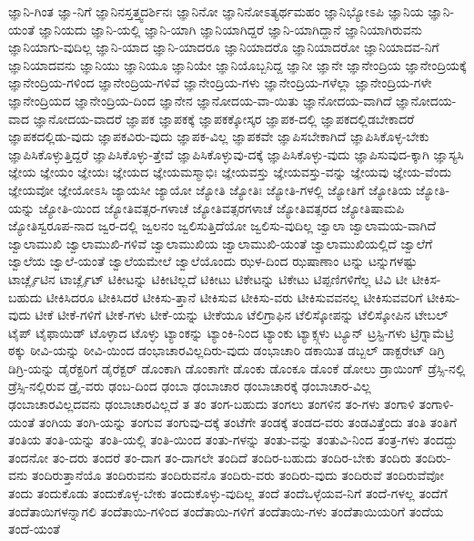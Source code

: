 {ಜ್ಞಾನಿ-ಗಿಂತ
ಜ್ಞಾ-ನಿಗೆ
ಜ್ಞಾನಿನಸ್ತತ್ತ್ವದರ್ಶಿನಃ
ಜ್ಞಾನಿನೋ
ಜ್ಞಾನಿನೋಽತ್ಯರ್ಥಮಹಂ
ಜ್ಞಾನಿಭ್ಯೋಽಪಿ
ಜ್ಞಾನಿಯ
ಜ್ಞಾನಿ-ಯಂತೆ
ಜ್ಞಾನಿಯದು
ಜ್ಞಾನಿ-ಯಲ್ಲಿ
ಜ್ಞಾನಿ-ಯಾಗಿ
ಜ್ಞಾನಿಯಾಗಿದ್ದರೆ
ಜ್ಞಾನಿ-ಯಾಗಿದ್ದಾನೆ
ಜ್ಞಾನಿಯಾಗಿರುವನು
ಜ್ಞಾನಿಯಾಗು-ವುದಿಲ್ಲ
ಜ್ಞಾನಿ-ಯಾದ
ಜ್ಞಾನಿ-ಯಾದರೂ
ಜ್ಞಾನಿಯಾದರೊ
ಜ್ಞಾನಿಯಾದರೋ
ಜ್ಞಾನಿಯಾದವ-ನಿಗೆ
ಜ್ಞಾನಿಯಾದವನು
ಜ್ಞಾನಿಯು
ಜ್ಞಾನಿಯೂ
ಜ್ಞಾನಿಯೇ
ಜ್ಞಾನಿಯೊಬ್ಬನಿದ್ದ
ಜ್ಞಾನೀ
ಜ್ಞಾನೇ
ಜ್ಞಾನೇಂದ್ರಿಯ
ಜ್ಞಾನೇಂದ್ರಿಯಕ್ಕೆ
ಜ್ಞಾನೇಂದ್ರಿಯ-ಗಳಿಂದ
ಜ್ಞಾನೇಂದ್ರಿಯ-ಗಳಿವೆ
ಜ್ಞಾನೇಂದ್ರಿಯ-ಗಳು
ಜ್ಞಾನೇಂದ್ರಿಯ-ಗಳೆಲ್ಲಾ
ಜ್ಞಾನೇಂದ್ರಿಯ-ಗಳೇ
ಜ್ಞಾನೇಂದ್ರಿಯದ
ಜ್ಞಾನೇಂದ್ರಿಯ-ದಿಂದ
ಜ್ಞಾನೇನ
ಜ್ಞಾನೋದಯ-ವಾ-ಯಿತು
ಜ್ಞಾನೋದಯ-ವಾಗಿದೆ
ಜ್ಞಾನೋದಯ-ವಾದ
ಜ್ಞಾನೋದಯ-ವಾದರೆ
ಜ್ಞಾಪಕ
ಜ್ಞಾಪಕಕ್ಕೆ
ಜ್ಞಾಪಕಕ್ಕೋಸ್ಕರ
ಜ್ಞಾಪಕ-ದಲ್ಲಿ
ಜ್ಞಾಪಕದಲ್ಲಿಡಬೇಕಾದರೆ
ಜ್ಞಾಪಕದಲ್ಲಿಡು-ವುದು
ಜ್ಞಾಪಕವಿರು-ವುದು
ಜ್ಞಾಪಕ-ವಿಲ್ಲ
ಜ್ಞಾಪಕವೇ
ಜ್ಞಾಪಿಸಬೇಕಾಗಿದೆ
ಜ್ಞಾಪಿಸಿಕೊಳ್ಳ-ಬೇಕು
ಜ್ಞಾಪಿಸಿಕೊಳ್ಳುತ್ತಿದ್ದರೆ
ಜ್ಞಾಪಿಸಿಕೊಳ್ಳು-ತ್ತೇವೆ
ಜ್ಞಾಪಿಸಿಕೊಳ್ಳುವು-ದಕ್ಕೆ
ಜ್ಞಾಪಿಸಿಕೊಳ್ಳು-ವುದು
ಜ್ಞಾಪಿಸುವುದ-ಕ್ಕಾಗಿ
ಜ್ಞಾಸ್ಯಸಿ
ಜ್ಞೇಯ
ಜ್ಞೇಯಂ
ಜ್ಞೇಯಃ
ಜ್ಞೇಯದ
ಜ್ಞೇಯಮಸ್ಮಾಭಿಃ
ಜ್ಞೇಯವಸ್ತು
ಜ್ಞೇಯವಸ್ತು-ವನ್ನು
ಜ್ಞೇಯವು
ಜ್ಞೇಯ-ವೆಂದು
ಜ್ಞೇಯವೋ
ಜ್ಞೇಯೋಽಸಿ
ಜ್ಯಾಯಸೀ
ಜ್ಯಾಯೋ
ಜ್ಯೋತಿ
ಜ್ಯೋತಿಃ
ಜ್ಯೋತಿ-ಗಳಲ್ಲಿ
ಜ್ಯೋತಿಗೆ
ಜ್ಯೋತಿಯ
ಜ್ಯೋತಿ-ಯನ್ನು
ಜ್ಯೋತಿ-ಯಿಂದ
ಜ್ಯೋತಿವತ್ಸರ-ಗಳಾಚೆ
ಜ್ಯೋತಿವತ್ಸರಗಳಾಚೆ
ಜ್ಯೋತಿವತ್ಸರದ
ಜ್ಯೋತಿಷಾಮಪಿ
ಜ್ಯೋತಿಸ್ವರೂಪ-ನಾದ
ಜ್ವರ-ದಲ್ಲಿ
ಜ್ವಲನಂ
ಜ್ವಲಿಸುತ್ತಿದೆಯೋ
ಜ್ವಲಿಸು-ವುದಿಲ್ಲ
ಜ್ವಾಲಾ
ಜ್ವಾಲಾಮಯ-ವಾಗಿದೆ
ಜ್ವಾಲಾಮುಖಿ
ಜ್ವಾಲಾಮುಖಿ-ಗಳಿವೆ
ಜ್ವಾಲಾಮುಖಿಯ
ಜ್ವಾಲಾಮುಖಿ-ಯಂತೆ
ಜ್ವಾಲಾಮುಖಿಯಲ್ಲಿದೆ
ಜ್ವಾಲೆಗೆ
ಜ್ವಾಲೆಯ
ಜ್ವಾಲೆ-ಯಂತೆ
ಜ್ವಾಲೆಯಮೇಲೆ
ಜ್ವಾಲೆಯೊಂದು
ಝಳ-ದಿಂದ
ಝಷಾಣಾಂ
ಟನ್ನು
ಟನ್ನುಗಳಷ್ಟು
ಟಾರ್ಚ್ಲೈಟಿನ
ಟಾರ್ಚ್ಲೈಟ್
ಟಿಕೀಟನ್ನು
ಟಿಕೀಟಿಲ್ಲದೆ
ಟಿಕೀಟು
ಟಿಕೇಟನ್ನು
ಟಿಕೇಟು
ಟಿಪ್ಪಣಿಗಳಿಗೆಲ್ಲ
ಟಿವಿ
ಟೀ
ಟೀಕಿಸ-ಬಹುದು
ಟೀಕಿಸಿದರೂ
ಟೀಕಿಸಿದರೆ
ಟೀಕಿಸು-ತ್ತಾನೆ
ಟೀಕಿಸುವ
ಟೀಕಿಸು-ವರು
ಟೀಕಿಸುವವನಲ್ಲ
ಟೀಕಿಸುವವರಿಗೆ
ಟೀಕಿಸು-ವುದು
ಟೀಕೆ
ಟೀಕೆ-ಗಳಿಗೆ
ಟೀಕೆ-ಗಳು
ಟೀಕೆ-ಯನ್ನು
ಟೀಕೆಯೂ
ಟೆಲಿಗ್ರಾಫಿನ
ಟೆಲಿಸ್ಕೋಪನ್ನು
ಟೆಲಿಸ್ಕೋಪಿನ
ಟೇಬಲ್
ಟೈಪ್
ಟೈಫಾಯಿಡ್
ಟೊಳ್ಳಾದ
ಟೊಳ್ಳು
ಟ್ಯಾಂಕನ್ನು
ಟ್ಯಾಂಕಿ-ನಿಂದ
ಟ್ಯಾಂಕು
ಟ್ಯಾಕ್ಸ್ಗಳು
ಟ್ಯೂನ್
ಟ್ರಸ್ಟಿ-ಗಳು
ಟ್ರಿಗ್ನಾಮೆಟ್ರಿ
ಠಕ್ಕು
ಠೀವಿ-ಯನ್ನು
ಠೀವಿ-ಯಿಂದ
ಡಂಭಾಚಾರವಿಲ್ಲದಿರು-ವುದು
ಡಂಭಾಚಾರಿ
ಡಕಾಯಿತ
ಡಬ್ಬಲ್
ಡಾಕ್ಟರೇಟ್
ಡಿಗ್ರಿ
ಡಿಗ್ರಿ-ಯನ್ನು
ಡೈರೆಕ್ಟರಿಗೆ
ಡೈರೆಕ್ಟರ್
ಡೊಂಕಾಗಿ
ಡೊಂಕಾಗೇ
ಡೊಂಕು
ಡೊಂಕೂ
ಡೊಂಕೆ
ಡೋಲು
ಡ್ರಾಯಿಂಗ್
ಡ್ರೆಸ್ಸಿ-ನಲ್ಲಿ
ಡ್ರೆಸ್ಸಿ-ನಲ್ಲಿರುವ
ಡ್ರೈ-ವರು
ಢಂಬ-ದಿಂದ
ಢಂಬಾ
ಢಂಬಾಚಾರ
ಢಂಬಾಚಾರಕ್ಕೆ
ಢಂಬಾಚಾರ-ವಿಲ್ಲ
ಢಂಬಾಚಾರವಿಲ್ಲದವನು
ಢಂಬಾಚಾರವಿಲ್ಲದೆ
ತ
ತಂ
ತಂಗ-ಬಹುದು
ತಂಗಲು
ತಂಗಳಿನ
ತಂ-ಗಳು
ತಂಗಾಳಿ
ತಂಗಾಳಿ-ಯಂತೆ
ತಂಗಿಯ
ತಂಗಿ-ಯನ್ನು
ತಂಗುವ
ತಂಗುವು-ದಕ್ಕೆ
ತಂಟೆಗೇ
ತಂಡಕ್ಕೆ
ತಂಡದ-ವರು
ತಂಡವಿತ್ತೆಂದು
ತಂತಿ
ತಂತಿಗೆ
ತಂತಿಯ
ತಂತಿ-ಯನ್ನು
ತಂತಿ-ಯಲ್ಲಿ
ತಂತಿ-ಯಿಂದ
ತಂತು-ಗಳನ್ನು
ತಂತು-ವನ್ನು
ತಂತುವಿ-ನಿಂದ
ತಂತ್ರ-ಗಳು
ತಂದದ್ದು
ತಂದನೋ
ತಂ-ದರು
ತಂದರೆ
ತಂ-ದಾಗ
ತಂ-ದಾಗಲೇ
ತಂದಿದೆ
ತಂದಿರ-ಬಹುದು
ತಂದಿರ-ಬೇಕು
ತಂದಿರು
ತಂದಿರು-ವನು
ತಂದಿರುತ್ತಾನೆಯೊ
ತಂದಿರುವನು
ತಂದಿರುವನೊ
ತಂದಿರು-ವರು
ತಂದಿರು-ವುದು
ತಂದಿರುವೆ
ತಂದಿರುವೆವೋ
ತಂದು
ತಂದುಕೊಡು
ತಂದುಕೊಳ್ಳ-ಬೇಕು
ತಂದುಕೊಳ್ಳು-ವುದಿಲ್ಲ
ತಂದೆ
ತಂದೆಒಳ್ಳೆಯವ-ನಿಗೆ
ತಂದೆ-ಗಳಲ್ಲ
ತಂದೆಗೆ
ತಂದೆತಾಯಿಗಳನ್ನಾಗಲಿ
ತಂದೆತಾಯಿ-ಗಳಿಂದ
ತಂದೆತಾಯಿ-ಗಳಿಗೆ
ತಂದೆತಾಯಿ-ಗಳು
ತಂದೆತಾಯಿಯರಿಗೆ
ತಂದೆಯ
ತಂದೆ-ಯಂತೆ
}
